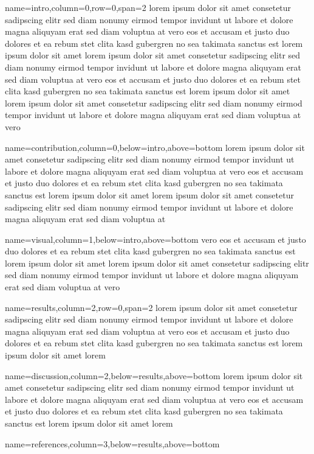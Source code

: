 \documentclass[landscape,specialSize,fontscale=0.3]{baposter}
\begin{document}
\begin{poster}
  {name=intro,column=0,row=0,span=2}{
    lorem ipsum dolor sit amet consetetur sadipscing elitr sed diam nonumy
    eirmod tempor invidunt ut labore et dolore magna aliquyam erat sed diam
    voluptua at vero eos et accusam et justo duo dolores et ea rebum stet clita
    kasd gubergren no sea takimata sanctus est lorem ipsum dolor sit amet lorem
    ipsum dolor sit amet consetetur sadipscing elitr sed diam nonumy eirmod
    tempor invidunt ut labore et dolore\cite{article}
    magna aliquyam erat sed diam voluptua at
    vero eos et accusam et justo duo dolores et ea rebum stet clita kasd
    gubergren no sea takimata sanctus est lorem ipsum dolor sit amet lorem ipsum
    dolor sit amet consetetur sadipscing elitr sed diam nonumy eirmod tempor
    invidunt ut labore et dolore magna aliquyam erat sed diam voluptua at vero
  }

  {name=contribution,column=0,below=intro,above=bottom}{
    lorem ipsum dolor sit amet consetetur sadipscing elitr sed diam nonumy
    eirmod tempor invidunt ut labore et dolore magna aliquyam erat sed diam
    voluptua at vero eos et accusam et justo duo dolores et ea rebum stet clita
    kasd gubergren no sea takimata sanctus est lorem ipsum dolor sit amet lorem
    ipsum dolor sit amet consetetur sadipscing elitr sed diam nonumy eirmod
    tempor invidunt ut labore et dolore\cite{article}
    magna aliquyam erat sed diam voluptua at
  }

  {name=visual,column=1,below=intro,above=bottom}{
    vero eos et accusam et justo duo dolores et ea rebum stet clita kasd
    gubergren no sea takimata sanctus est lorem ipsum dolor sit amet lorem ipsum
    dolor sit amet consetetur sadipscing elitr sed diam nonumy eirmod tempor
    invidunt ut labore et dolore magna aliquyam erat sed diam voluptua at vero
  }


  {name=results,column=2,row=0,span=2}{
    lorem ipsum dolor sit amet consetetur sadipscing elitr sed diam nonumy
    eirmod tempor invidunt ut labore et dolore magna aliquyam erat sed diam
    voluptua at vero eos et accusam et justo duo dolores et ea rebum stet clita
    kasd gubergren no sea takimata sanctus est lorem ipsum dolor sit amet lorem
  }

  {name=discussion,column=2,below=results,above=bottom}{
    lorem ipsum dolor sit amet consetetur sadipscing elitr sed diam nonumy
    eirmod tempor invidunt ut labore et dolore magna aliquyam erat sed diam
    voluptua at vero eos et accusam et justo duo dolores et ea rebum stet clita
    kasd gubergren no sea takimata sanctus est lorem ipsum dolor sit amet lorem
  }

  {name=references,column=3,below=results,above=bottom}{
    
    
  }

\end{poster}
\end{document}
